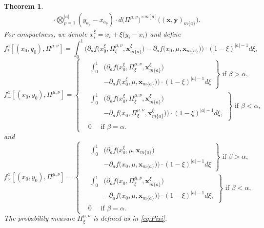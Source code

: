 \documentclass[a4paper,11pt,twoside]{article}
\numberwithin{equation}{section}
\theoremstyle{plain}
\newtheorem{theorem}{Theorem}[section]
\newcommand{\1}{\mathbbm{1}}
\begin{document}
\begin{theorem}
\begin{align}
			\cdot 
			\bigotimes_{p=1}^{|a|} ( y_{a_p} - x_{a_p}) \cdot d\big( \Pi^{\mu, \nu}\big)^{\times m[a]} \Big( (\boldsymbol{x}, \boldsymbol{y})_{m\{a\}}\Big). 
		\end{align}
		For compactness, we denote $x_i^{\xi} = x_i + \xi\big( y_i - x_i \big)$ and define
		\begin{equation*}
			f_{\ast}^{a}[(x_0, y_0), \Pi^{\mu, \nu}] 
			= 
			\int_0^1 \bigg( \partial_a f \Big(x_0^\xi, \Pi^{\mu, \nu}_\xi,  \boldsymbol{x}_{m\{a\}}^\xi \Big) 
			- \partial_a f \Big(x_0, \mu, \boldsymbol{x}_{m\{a\}} \Big)\bigg) \cdot (1-\xi)^{|a|-1} d\xi, 
		\end{equation*}
		\begin{equation*}
			f_{+}^{a}[(x_0, y_0), \Pi^{\mu, \nu}]
			=\left\{ 
			\begin{aligned}
				&\left.
				\begin{aligned}
					\int_0^1& \bigg( \partial_a f \Big(x_0^\xi, \Pi^{\mu, \nu}_\xi, \boldsymbol{x}_{m\{a\}}^\xi \Big) 
					\\
					&- \partial_a f \Big(x_0^\xi, \mu, \boldsymbol{x}_{m\{a\}} \Big)\bigg) \cdot (1-\xi)^{|a|-1} d\xi
				\end{aligned} \right\} \mbox{ if $\beta>\alpha$,}
				\\
				&\left.
				\begin{aligned}
					\int_0^1& \bigg( \partial_a f \Big(x_0^\xi, \Pi^{\mu, \nu}_\xi, \boldsymbol{x}_{m\{a\}}^\xi \Big) 
					\\
					&- \partial_a f \Big(x_0, \Pi^{\mu, \nu}_\xi, \boldsymbol{x}_{m\{a\}}^\xi  \Big)\bigg) \cdot (1-\xi)^{|a|-1} d\xi,
				\end{aligned} \right\} \mbox{ if $\beta<\alpha$,}
				\\
				&0 \quad \mbox{ if $\beta=\alpha$.}
			\end{aligned}\right.
		\end{equation*}
		and
		\begin{equation*}
			f_{\times}^{a}[(x_0, y_0), \Pi^{\mu, \nu}]
			=\left\{ 
			\begin{aligned}
				&\left.
				\begin{aligned}
					\int_0^1& \bigg( \partial_a f \Big(x_0^{\xi}, \mu, \boldsymbol{x}_{m\{a\}} \Big) 
					\\
					&- \partial_a f \Big(x_0, \mu, \boldsymbol{x}_{m\{a\}} \Big)\bigg) \cdot (1-\xi)^{|a|-1} d\xi
				\end{aligned} \right\} \mbox{ if $\beta>\alpha$,}
				\\
				&\left.
				\begin{aligned}
					\int_0^1& \bigg( \partial_a f \Big(x_0, \Pi^{\mu, \nu}_\xi, \boldsymbol{x}_{m\{a\}}^{\xi} \Big) 
					\\
					&- \partial_a f \Big(x_0, \mu, \boldsymbol{x}_{m\{a\}} \Big)\bigg) \cdot (1-\xi)^{|a|-1} d\xi,
				\end{aligned} \right\} \mbox{ if $\beta<\alpha$,}
				\\
				&0 \quad \mbox{ if $\beta=\alpha$.}
			\end{aligned}\right.
		\end{equation*}
		The probability measure $\Pi^{\mu,\nu}_{\xi}$ is defined as in \eqref{eq:Pixi}. 
		

\end{theorem}
\end{document}
